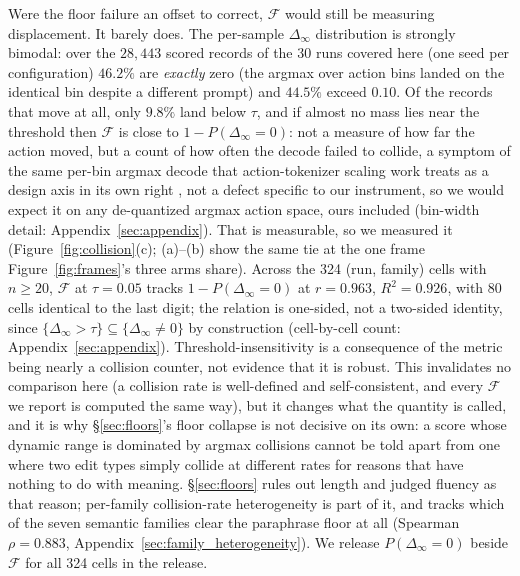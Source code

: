 \documentclass{article}
\begin{document}
Were the floor failure an offset to correct, $\mathcal{F}$ would still be measuring displacement. It barely does. The per-sample $\Delta_\infty$ distribution is strongly bimodal: over the $28{,}443$ scored records of the 30 runs covered here (one seed per configuration) $46.2\%$ are \emph{exactly} zero (the argmax over action bins landed on the identical bin despite a different prompt) and $44.5\%$ exceed $0.10$. Of the records that move at all, only $9.8\%$ land below $\tau$, and if almost no mass lies near the threshold then $\mathcal{F}$ is close to $1 - P(\Delta_\infty = 0)$: not a measure of how far the action moved, but a count of how often the decode failed to collide, a symptom of the same per-bin argmax decode that action-tokenizer scaling work treats as a design axis in its own right \citep{fast2025}, not a defect specific to our instrument, so we would expect it on any de-quantized argmax action space, ours included (bin-width detail: Appendix~\ref{sec:appendix}).
That is measurable, so we measured it (Figure~\ref{fig:collision}(c); (a)--(b) show the same tie at the one frame Figure~\ref{fig:frames}'s three arms share). Across the 324 (run, family) cells with $n \geq 20$, $\mathcal{F}$ at $\tau{=}0.05$ tracks $1 - P(\Delta_\infty{=}0)$ at $r = 0.963$, $R^2 = 0.926$, with 80 cells identical to the last digit; the relation is one-sided, not a two-sided identity, since $\{\Delta_\infty{>}\tau\} \subseteq \{\Delta_\infty{\neq}0\}$ by construction (cell-by-cell count: Appendix~\ref{sec:appendix}). Threshold-insensitivity is a consequence of the metric being nearly a collision counter, not evidence that it is robust. This invalidates no comparison here (a collision rate is well-defined and self-consistent, and every $\mathcal{F}$ we report is computed the same way), but it changes what the quantity is called, and it is why \S\ref{sec:floors}'s floor collapse is not decisive on its own: a score whose dynamic range is dominated by argmax collisions cannot be told apart from one where two edit types simply collide at different rates for reasons that have nothing to do with meaning. \S\ref{sec:floors} rules out length and judged fluency as that reason; per-family collision-rate heterogeneity is part of it, and tracks which of the seven semantic families clear the paraphrase floor at all (Spearman $\rho=0.883$, Appendix~\ref{sec:family_heterogeneity}). We release $P(\Delta_\infty{=}0)$ beside $\mathcal{F}$ for all 324 cells in the release.
\end{document}

